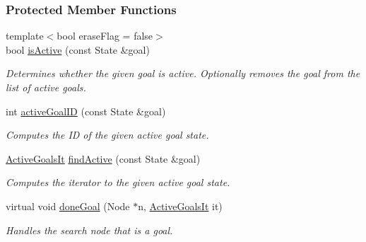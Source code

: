 \subsubsection*{Protected Member Functions}
\begin{DoxyCompactItemize}
\item 
{\footnotesize template$<$bool erase\+Flag = false$>$ }\\bool \hyperlink{structslb_1_1ext_1_1policy_1_1goalHandler_1_1MultipleGoal_acdb94b8e9f035fbdb3ea45188964abfa}{is\+Active} (const State \&goal)
\begin{DoxyCompactList}\small\item\em Determines whether the given goal is active. Optionally removes the goal from the list of active goals. \end{DoxyCompactList}\item 
int \hyperlink{structslb_1_1ext_1_1policy_1_1goalHandler_1_1MultipleGoal_ac6197e621b246d5347155a3f226da9f1}{active\+Goal\+ID} (const State \&goal)
\begin{DoxyCompactList}\small\item\em Computes the ID of the given active goal state. \end{DoxyCompactList}\item 
\hyperlink{structslb_1_1ext_1_1policy_1_1goalHandler_1_1MultipleGoal_a6cbdf80decb53458becf058bbaae6971}{Active\+Goals\+It} \hyperlink{structslb_1_1ext_1_1policy_1_1goalHandler_1_1MultipleGoal_ab8b2e36fc96d3162476cab3c8c75aa05}{find\+Active} (const State \&goal)
\begin{DoxyCompactList}\small\item\em Computes the iterator to the given active goal state. \end{DoxyCompactList}\item 
virtual void \hyperlink{structslb_1_1ext_1_1policy_1_1goalHandler_1_1MultipleGoal_a49b937b31fcf0ecb22d71f75d12e0a7c}{done\+Goal} (Node $\ast$n, \hyperlink{structslb_1_1ext_1_1policy_1_1goalHandler_1_1MultipleGoal_a6cbdf80decb53458becf058bbaae6971}{Active\+Goals\+It} it)
\begin{DoxyCompactList}\small\item\em Handles the search node that is a goal. \end{DoxyCompactList}\end{DoxyCompactItemize}
